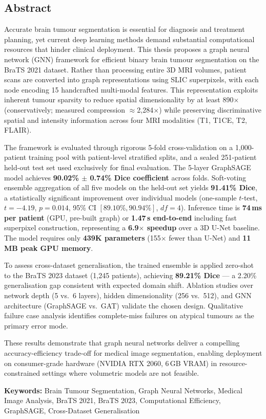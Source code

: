 \begin{center}
    \section*{Abstract}
\end{center}

Accurate brain tumour segmentation is essential for diagnosis and treatment planning, yet current deep learning methods demand substantial computational resources that hinder clinical deployment. This thesis proposes a graph neural network (GNN) framework for efficient binary brain tumour segmentation on the BraTS 2021 dataset. Rather than processing entire 3D MRI volumes, patient scans are converted into graph representations using SLIC superpixels, with each node encoding 15 handcrafted multi-modal features. This representation exploits inherent tumour sparsity to reduce spatial dimensionality by at least 890$\times$ (conservatively; measured compression $\approx$2,284$\times$) while preserving discriminative spatial and intensity information across four MRI modalities (T1, T1CE, T2, FLAIR).

The framework is evaluated through rigorous 5-fold cross-validation on a 1,000-patient training pool with patient-level stratified splits, and a sealed 251-patient held-out test set used exclusively for final evaluation. The 5-layer GraphSAGE model achieves \textbf{90.02\% $\pm$ 0.74\% Dice coefficient} across folds. Soft-voting ensemble aggregation of all five models on the held-out set yields \textbf{91.41\% Dice}, a statistically significant improvement over individual models (one-sample $t$-test, $t = -4.19$, $p = 0.014$, 95\% CI $[89.10\%, 90.94\%]$, $df = 4$). Inference time is \textbf{74\,ms per patient} (GPU, pre-built graph) or \textbf{1.47\,s end-to-end} including fast superpixel construction, representing a \textbf{6.9$\times$ speedup} over a 3D U-Net baseline. The model requires only \textbf{439K parameters} (155$\times$ fewer than U-Net) and \textbf{11\,MB peak GPU memory}.

To assess cross-dataset generalisation, the trained ensemble is applied zero-shot to the BraTS 2023 dataset (1,245 patients), achieving \textbf{89.21\% Dice} — a 2.20\% generalisation gap consistent with expected domain shift. Ablation studies over network depth (5 vs.\ 6 layers), hidden dimensionality (256 vs.\ 512), and GNN architecture (GraphSAGE vs.\ GAT) validate the chosen design. Qualitative failure case analysis identifies complete-miss failures on atypical tumours as the primary error mode.

These results demonstrate that graph neural networks deliver a compelling accuracy-efficiency trade-off for medical image segmentation, enabling deployment on consumer-grade hardware (NVIDIA RTX 2060, 6\,GB VRAM) in resource-constrained settings where volumetric models are not feasible.

\textbf{Keywords:} Brain Tumour Segmentation, Graph Neural Networks, Medical Image Analysis, BraTS 2021, BraTS 2023, Computational Efficiency, GraphSAGE, Cross-Dataset Generalisation
